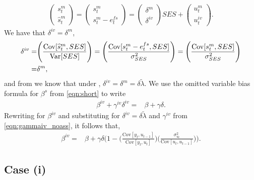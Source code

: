 \begin{align}\label{eqn:balancing_shat}
 \begin{pmatrix} s_t^m \\ \widehat{s}_{t}^m   \end{pmatrix}= \begin{pmatrix} s_t^m \\ s_t^m - e_{t}^{fs} \end{pmatrix}=\begin{pmatrix} \delta^m \\ \delta^{iv}  \end{pmatrix} SES +  \begin{pmatrix} u^m_{t}\\ u^{iv}_t  \end{pmatrix}.
\end{align} 
We have that $\delta^{iv}=\delta^m$,
\begin{align}
    \delta^{iv} =&\Bigg(\frac{\mathrm{Cov}[\widehat{s}_{t}^m,SES]}{\mathrm{Var}[SES]}\Bigg)=\Bigg(\frac{\mathrm{Cov}[ s_t^m - e_{t}^{fs},SES]}{\sigma_{SES}^2}\Bigg) = \Bigg(\frac{\mathrm{Cov}[s_{t}^m,SES]}{\sigma_{SES}^2}\Bigg) \\ \notag
    =&\delta^m,
\end{align}
and from  we know that under , $\delta^{iv}=\delta^m=\delta \widetilde{\lambda}$. We use the omitted variable bias formula for $\beta^s$ from \eqref{eqn:short} to write
\begin{align}
    \beta^{iv}+\gamma^{iv}\delta^{iv}=&\beta+\gamma\delta.
\end{align}
Rewriting for $\beta^{iv}$ and substituting for $\delta^{iv}=\delta\widetilde{\lambda}$ and $\gamma^{iv}$ from \eqref{eqn:gammaiv_noass},  it follows that,
\begin{align}\label{eqn:betaiv_noass}
    \beta^{iv}=& \beta+ \gamma\delta \Bigg(1-\Bigg(\frac{\mathrm{Cov}[y_{t},u_{t-1}]}{\mathrm{Cov}[y_{t},u_{t}]}\Bigg)\Bigg( \frac{\sigma_{u_{t}}^2}{\mathrm{Cov}[u_{t},u_{t-1}]}\Bigg)\Bigg).
\end{align}

\subsection{Case (i)}

